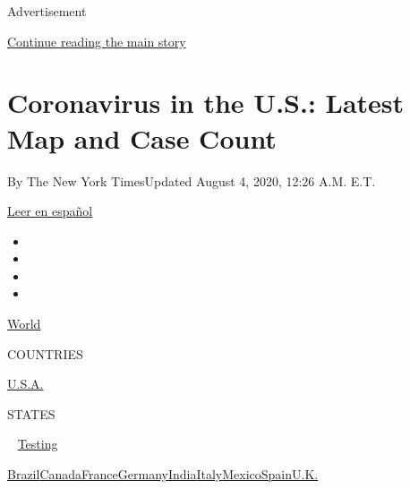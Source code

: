 Advertisement

\protect\hyperlink{after-top}{Continue reading the main story}

\hypertarget{coronavirus-in-the-us-latest-map-and-case-count}{%
\section{Coronavirus in the U.S.: Latest Map and Case
Count}\label{coronavirus-in-the-us-latest-map-and-case-count}}

By The New York TimesUpdated August 4, 2020, 12:26 A.M. E.T.

\href{https://www.nytimes.com/es/interactive/2020/espanol/mundo/coronavirus-en-estados-unidos.html}{Leer
en español}

\begin{itemize}
\item
\item
\item
\item
\end{itemize}

\href{https://www.nytimes.com/interactive/2020/world/coronavirus-maps.html}{World}~

COUNTRIES

\textbar{}
\href{https://www.nytimes.com/interactive/2020/us/coronavirus-us-cases.html}{U.S.A.}~

STATES

~
\href{https://www.nytimes.com/interactive/2020/us/coronavirus-testing.html}{Testing}

\href{https://www.nytimes.com/interactive/2020/world/americas/brazil-coronavirus-cases.html}{Brazil}\href{https://www.nytimes.com/interactive/2020/world/canada/canada-coronavirus-cases.html}{Canada}\href{https://www.nytimes.com/interactive/2020/world/europe/france-coronavirus-cases.html}{France}\href{https://www.nytimes.com/interactive/2020/world/europe/germany-coronavirus-cases.html}{Germany}\href{https://www.nytimes.com/interactive/2020/world/asia/india-coronavirus-cases.html}{India}\href{https://www.nytimes.com/interactive/2020/world/europe/italy-coronavirus-cases.html}{Italy}\href{https://www.nytimes.com/interactive/2020/world/americas/mexico-coronavirus-cases.html}{Mexico}\href{https://www.nytimes.com/interactive/2020/world/europe/spain-coronavirus-cases.html}{Spain}\href{https://www.nytimes.com/interactive/2020/world/europe/united-kingdom-coronavirus-cases.html}{U.K.}

